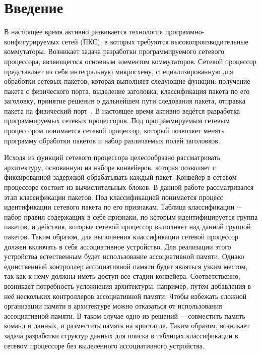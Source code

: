 \documentclass[a4peper, 12pt, titlepage, finall]{report}
\begin{document}
    \newpage
    \tableofcontents
    \newpage

    \chapter*{Введение}
         В настоящее время активно развивается технология программно-конфигурируемых сетей (ПКС), в которых требуются высокопроизводительные 
        коммутаторы. Возникает задача разработки программируемого сетевого процессора, являющегося основным элементом коммутаторов. Сетевой процессор 
        представляет из себя интегральную микросхему, специализированную для обработки сетевых пакетов, которая выполняет следующие функции:
        получение пакета с физического порта, выделение заголовка,
        классификация пакета по его заголовку, принятие решения о дальнейшем пути следования пакета, отправка пакета на физический порт~\cite{chao2007high:1}.
        В настоящее время активно ведётся разработка программируемых сетевых процессоров. Под программируемым сетевым процессором
        понимается сетевой процессор, который позволяет менять программу обработки пакетов и набор различаемых полей заголовков.
        
        Исходя из функций сетевого процессора целесообразно рассматривать архитектуру, основанную на
        наборе конвейеров, которая позволяет с фиксированной задержкой обрабатывать каждый пакет. 
        Конвейер в сетевом процессоре состоит из вычислительных блоков. В данной работе рассматривался этап классификации пакетов. 
        Под классификацией понимается процесс идентификации сетевого пакета по его признакам.
        Таблица классификации $-$ набор правил содержащих в себе признаки, по которым идентифицируется группа пакетов,
        и действия, которые сетевой процессор выполняет над данной группой пакетов. 
        Таким образом, для выполнения классификации сетевой процессор должен включать в себя ассоциативное устройство. Для реализации этого устройства естественным будет использование 
        ассоциативной памяти. Однако единственный контроллер ассоциативной памяти будет являться узким местом, так как к нему должны иметь доступ все стадии конвейера.
        Соответственно, возникает потребность усложнения архитектуры, например, путём добавления в неё нескольких контроллеров ассоциативной памяти.
        Чтобы избежать сложной организации памяти в архитектуре можно отказаться от использования ассоциативной памяти. 
        В таком случае одно из решений $-$ совместить память команд и данных, и разместить память на кристалле.
        Таким образом, возникает задача разработки структур данных для поиска в таблицах классификации в сетевом процессоре без выделенного ассоциативного устройства.
 
\end{document}
